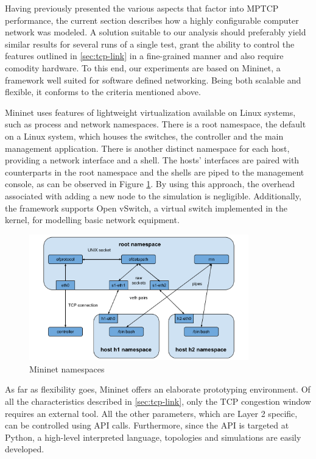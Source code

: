 
Having previously presented the various aspects that factor into MPTCP
performance, the current section describes how a highly configurable computer
network was modeled. A solution suitable to our analysis should preferably
yield similar results for several runs of a single test, grant the ability to
control the features outlined in \ref{sec:tcp-link} in a fine-grained manner
and also require comodity hardware. To this end, our experiments are based on
Mininet, a framework well suited for software defined networking. Being both
scalable and flexible, it conforms to the criteria mentioned above.

Mininet uses features of lightweight virtualization available on Linux
systems, such as process and network namespaces\cite{mininet}. There is a root
namespace, the default on a Linux system, which houses the switches, the
controller and the main management application. There is another distinct
namespace for each host, providing a network interface and a shell. The hosts'
interfaces are paired with counterparts in the root namespace and the shells
are piped to the management console, as can be observed in Figure
\ref{fig:mininet-design}. By using this approach, the overhead associated with
adding a new node to the simulation is negligible. Additionally, the framework
supports Open vSwitch, a virtual switch implemented in the kernel, for
modelling basic network equipment.

\begin{figure}
  \centering
  \includegraphics[width=0.85\textwidth]{img/mininet-design}
  \caption{Mininet namespaces}
  \label{fig:mininet-design}
\end{figure}

As far as flexibility goes, Mininet offers an elaborate prototyping
environment. Of all the characteristics described in \ref{sec:tcp-link},
only the TCP congestion window requires an external tool. All the other
parameters, which are Layer 2 specific, can be controlled using API calls.
Furthermore, since the API is targeted at Python, a high-level interpreted
language, topologies and simulations are easily developed.

